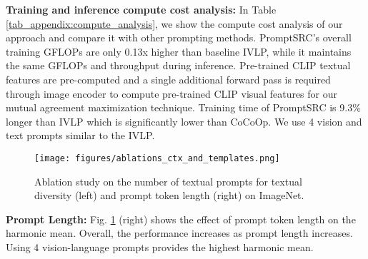\documentclass[10pt,twocolumn,letterpaper]{article}
\newcommand{\tablestyle}[2]{\setlength{\tabcolsep}{#1}\renewcommand{\arraystretch}{#2}\centering\footnotesize}
\begin{document}
\begin{table}[!t]
\tablestyle{5.5pt}{1.1}
\addtolength{\tabcolsep}{-4.4pt}
\vspace{-1em}
\caption[caption]{{\small PromptSRC compute cost comparison using SUN397 dataset. Training time for all methods is calculated for 10 epochs on a single A100 GPU on SUN397 dataset.}
\label{tab_appendix:compute_analysis}
}
\end{table} 

\noindent \textbf{{Training and inference compute cost analysis:}} In Table \ref{tab_appendix:compute_analysis}, we show the compute cost analysis of our approach and compare it with other prompting methods. PromptSRC's overall training GFLOPs are only 0.13x higher than baseline IVLP, while it maintains the same GFLOPs and throughput during inference. Pre-trained CLIP textual features are pre-computed and a single additional forward pass is required through image encoder to compute pre-trained CLIP visual features for our mutual agreement maximization technique. Training time of PromptSRC is 9.3\% longer than IVLP which is significantly lower than CoCoOp. We use 4 vision and text prompts similar to the IVLP.

\begin{figure}[!t]
    \centering
    \texttt{[image: figures/ablations\_ctx\_and\_templates.png]}
\caption{Ablation study on the number of textual prompts for textual diversity (left) and prompt token length (right) on ImageNet.}
  \label{fig:ctx_templates_ablation}
\end{figure}

\noindent \textbf{Prompt Length:}
Fig. \ref{fig:ctx_templates_ablation} (right) shows the effect of prompt token length on the harmonic mean. Overall, the performance increases as prompt length increases. Using 4 vision-language prompts provides the highest harmonic mean.
\end{document}
